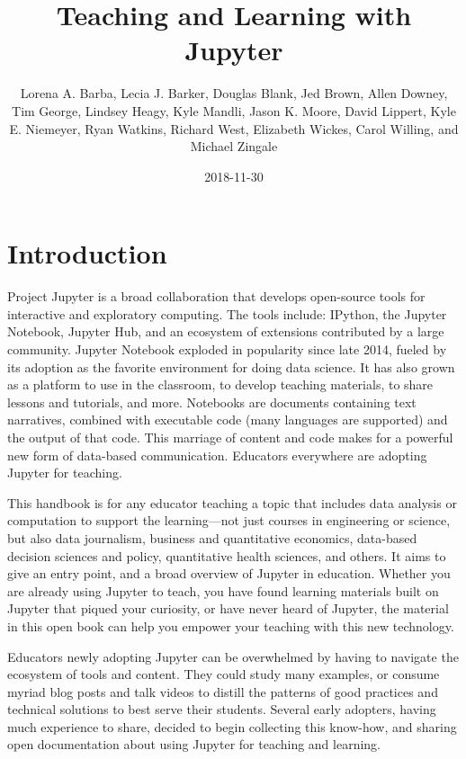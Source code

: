 \documentclass[]{book}
\title{Teaching and Learning with Jupyter}
\author{Lorena A. Barba, Lecia J. Barker, Douglas Blank, Jed Brown, Allen
Downey, Tim George, Lindsey Heagy, Kyle Mandli, Jason K. Moore, David
Lippert, Kyle E. Niemeyer, Ryan Watkins, Richard West, Elizabeth Wickes,
Carol Willing, and Michael Zingale}
\date{2018-11-30}
\begin{document}
\maketitle

{
\setcounter{tocdepth}{1}
\tableofcontents
}
\chapter{Introduction}\label{intro}

Project Jupyter is a broad collaboration that develops open-source tools
for interactive and exploratory computing. The tools include: IPython,
the Jupyter Notebook, Jupyter Hub, and an ecosystem of extensions
contributed by a large community. Jupyter Notebook exploded in
popularity since late 2014, fueled by its adoption as the favorite
environment for doing data science. It has also grown as a platform to
use in the classroom, to develop teaching materials, to share lessons
and tutorials, and more. Notebooks are documents containing text
narratives, combined with executable code (many languages are supported)
and the output of that code. This marriage of content and code makes for
a powerful new form of data-based communication. Educators everywhere
are adopting Jupyter for teaching.

This handbook is for any educator teaching a topic that includes data
analysis or computation to support the learning---not just courses in
engineering or science, but also data journalism, business and
quantitative economics, data-based decision sciences and policy,
quantitative health sciences, and others. It aims to give an entry
point, and a broad overview of Jupyter in education. Whether you are
already using Jupyter to teach, you have found learning materials built
on Jupyter that piqued your curiosity, or have never heard of Jupyter,
the material in this open book can help you empower your teaching with
this new technology.

Educators newly adopting Jupyter can be overwhelmed by having to
navigate the ecosystem of tools and content. They could study many
examples, or consume myriad blog posts and talk videos to distill the
patterns of good practices and technical solutions to best serve their
students. Several early adopters, having much experience to share,
decided to begin collecting this know-how, and sharing open
documentation about using Jupyter for teaching and learning.
\end{document}
